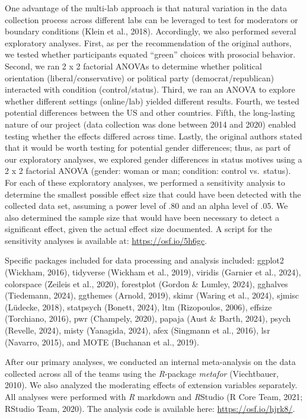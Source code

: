 \documentclass[
]{article}
\begin{document}
One advantage of the multi-lab approach is that natural variation in the
data collection process across different labs can be leveraged to test
for moderators or boundary conditions (Klein et al., 2018). Accordingly,
we also performed several exploratory analyses. First, as per the
recommendation of the original authors, we tested whether participants
equated ``green'' choices with prosocial behavior. Second, we ran 2 x 2
factorial ANOVAs to determine whether political orientation
(liberal/conservative) or political party (democrat/republican)
interacted with condition (control/status). Third, we ran an ANOVA to
explore whether different settings (online/lab) yielded different
results. Fourth, we tested potential differences between the US and
other countries. Fifth, the long-lasting nature of our project (data
collection was done between 2014 and 2020) enabled testing whether the
effects differed across time. Lastly, the original authors stated that
it would be worth testing for potential gender differences; thus, as
part of our exploratory analyses, we explored gender differences in
status motives using a 2 x 2 factorial ANOVA (gender: woman or man;
condition: control vs.~status). For each of these exploratory analyses,
we performed a sensitivity analysis to determine the smallest possible
effect size that could have been detected with the collected data set,
assuming a power level of .80 and an alpha level of .05. We also
determined the sample size that would have been necessary to detect a
significant effect, given the actual effect size documented. A script
for the sensitivity analyses is available at:
\url{https://osf.io/5h6gc}.

Specific packages included for data processing and analysis included:
ggplot2 (Wickham, 2016), tidyverse (Wickham et al., 2019), viridis
(Garnier et al., 2024), colorspace (Zeileis et al., 2020), forestplot
(Gordon \& Lumley, 2024), gghalves (Tiedemann, 2024), ggthemes (Arnold,
2019), skimr (Waring et al., 2024), sjmisc (Lüdecke, 2018), statpsych
(Bonett, 2024), ltm (Rizopoulos, 2006), effsize (Torchiano, 2016), pwr
(Champely, 2020), papaja (Aust \& Barth, 2024), psych (Revelle, 2024),
misty (Yanagida, 2024), afex (Singmann et al., 2016), lsr (Navarro,
2015), and MOTE (Buchanan et al., 2019).

After our primary analyses, we conducted an internal meta-analysis on
the data collected across all of the teams using the \emph{R}-package
\emph{metafor} (Viechtbauer, 2010). We also analyzed the moderating
effects of extension variables separately. All analyses were performed
with \emph{R} markdown and \emph{R}Studio (R Core Team, 2021; RStudio
Team, 2020). The analysis code is available here:
\url{https://osf.io/hjrk8/}.
\end{document}

